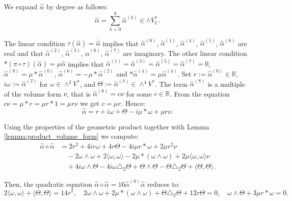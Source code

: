 \documentclass[10pt,a4paper,twoside,reqno]{amsart}
\theoremstyle{plain}
\theoremstyle{definition}
\theoremstyle{remark}
\def\C{\mathbb{C}}
\def\R{\mathbb{R}}
\def\R{\mathbb{R}}
\newcommand{\escal}[1]{\langle#1\rangle}
\begin{document}
\noindent
We expand $\widehat{\alpha}$ by degree as follows:
\begin{equation*}
\widehat{\alpha}=\sum_{k=0}^8\widehat{\alpha}^{(k)}\in\wedge V^*_\C.
\end{equation*}

\noindent
The linear condition $\tau(\widehat{\alpha})=\overline{\widehat{\alpha}}$ implies that $\widehat{\alpha}^{(0)}$, $\widehat{\alpha}^{(1)}$, $\widehat{\alpha}^{(4)}$, $\widehat{\alpha}^{(5)}$, $\widehat{\alpha}^{(8)}$ are real and that $\widehat{\alpha}^{(2)}$, $\widehat{\alpha}^{(3)}$, $\widehat{\alpha}^{(6)}$, $\widehat{\alpha}^{(7)}$ are imaginary. The other linear condition $*(\pi\circ\tau)(\widehat{\alpha})=\mu\widehat{\alpha}$ implies that $\widehat{\alpha}^{(1)}=\widehat{\alpha}^{(3)}=\widehat{\alpha}^{(5)}=\widehat{\alpha}^{(7)}=0$, $\widehat{\alpha}^{(8)}=\mu*\widehat{\alpha}^{(0)}$, $\widehat{\alpha}^{(6)}=-\mu*\widehat{\alpha}^{(2)}$ and $*\widehat{\alpha}^{(4)}=\mu\widehat{\alpha}^{(4)}$. Set $r:=\widehat{\alpha}^{(0)}\in\R$, $i\omega:=\widehat{\alpha}^{(2)}$ for $\omega\in\wedge^2V^*$, and $\Theta:=\widehat{\alpha}^{(4)}\in\wedge^4V^*$. The term $\widehat{\alpha}^{(8)}$ is a multiple of the volume form $\nu$, that is $\widehat{\alpha}^{(8)}=c\nu$ for some $c\in\R$. From the equation $c\nu=\mu*r=\mu r*1=\mu r\nu$ we get $c=\mu r$. Hence: 
\begin{equation*}
\widehat{\alpha}=r+i\omega+\Theta-i\mu*\omega+\mu r\nu.
\end{equation*}

\noindent
Using the properties of the geometric product together with Lemma \ref{lemma:product_volume_form} we compute: 
\begin{align*}
\widehat{\alpha}\diamond\widehat{\alpha}&=2r^2+4ir\omega+4r\Theta-4i\mu r*\omega+2\mu r^2\nu\\
&\quad-2\omega\wedge\omega+2\escal{\omega,\omega}-2\mu*(\omega\wedge\omega)+2\mu\escal{\omega,\omega}\nu\\
&\quad+4i\omega\wedge\Theta-4i\omega\triangle_2\Theta+\Theta\wedge\Theta-\Theta\triangle_2\Theta+\escal{\Theta,\Theta}.
\end{align*}

\noindent
Then, the quadratic equation $\widehat{\alpha}\diamond\widehat{\alpha}=16\widehat{\alpha}^{(0)}\widehat{\alpha}$ reduces to:
\begin{equation*}
2\escal{\omega,\omega}+\escal{\Theta,\Theta}=14r^2,\quad 2\omega\wedge\omega+2\mu*(\omega\wedge\omega)+\Theta\triangle_2\Theta+12r\Theta=0,\quad \omega\wedge\Theta+3\mu r*\omega=0.    
\end{equation*}
\end{document}
